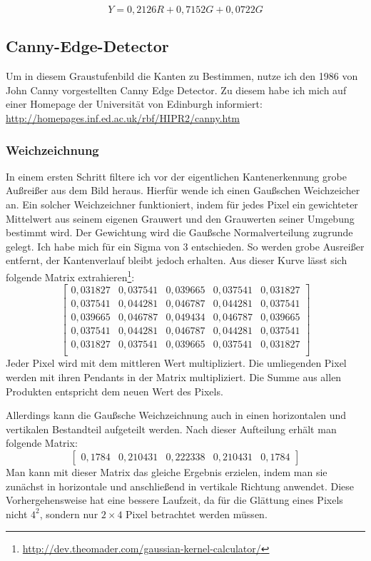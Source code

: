 \begin{equation}
Y = 0,2126R+0,7152G+0,0722G
\end{equation}

\subsection{Canny-Edge-Detector}
Um in diesem Graustufenbild die Kanten zu Bestimmen, nutze ich den 1986 von John Canny vorgestellten Canny Edge Detector. Zu diesem habe ich mich auf einer Homepage der Universität von Edinburgh informiert: \url{http://homepages.inf.ed.ac.uk/rbf/HIPR2/canny.htm}
\subsubsection{Weichzeichnung}
In einem ersten Schritt filtere ich vor der eigentlichen Kantenerkennung grobe Außreißer aus dem Bild heraus. Hierfür wende ich einen Gaußschen Weichzeicher an. Ein solcher Weichzeichner funktioniert, indem für jedes Pixel ein gewichteter Mittelwert aus seinem eigenen Grauwert und den Grauwerten seiner Umgebung bestimmt wird. Der Gewichtung wird die Gaußsche Normalverteilung zugrunde gelegt. Ich habe mich für ein Sigma von 3 entschieden. So werden grobe Ausreißer entfernt, der Kantenverlauf bleibt jedoch erhalten. Aus dieser Kurve lässt sich folgende Matrix extrahieren\footnote{\url{http://dev.theomader.com/gaussian-kernel-calculator/}}:
\begin{equation}
	\begin{bmatrix}
	0,031827&0,037541&0,039665&0,037541&0,031827 \\
	0,037541&0,044281&0,046787&0,044281&0,037541 \\
	0,039665&0,046787&0,049434&0,046787&0,039665 \\
	0,037541&0,044281&0,046787&0,044281&0,037541 \\
	0,031827&0,037541&0,039665&0,037541&0,031827 \\
	\end{bmatrix}
\end{equation}
Jeder Pixel wird mit dem mittleren Wert multipliziert. Die umliegenden Pixel werden mit ihren Pendants in der Matrix multipliziert. Die Summe aus allen Produkten entspricht dem neuen Wert des Pixels.

Allerdings kann die Gaußsche Weichzeichnung auch in einen horizontalen und vertikalen Bestandteil aufgeteilt werden. Nach dieser Aufteilung erhält man folgende Matrix:
\begin{equation}
	\begin{bmatrix}
	0,1784&0,210431&0,222338&0,210431&0,1784
	\end{bmatrix}
\end{equation}
Man kann mit dieser Matrix das gleiche Ergebnis erzielen, indem man sie zunächst in horizontale und anschließend in vertikale Richtung anwendet. Diese Vorhergehensweise hat eine bessere Laufzeit, da für die Glättung eines Pixels nicht \(4^2\), sondern nur \(2\times 4\) Pixel betrachtet werden müssen.

